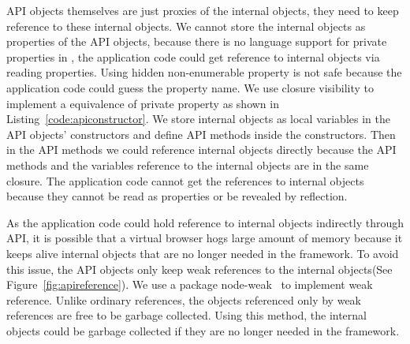 API objects themselves are just proxies of the internal objects,
they need to keep reference to these internal objects.
We cannot store the internal objects as properties of the API objects,
because there is no language support for private properties in \js,
the application code could get reference to internal objects
via reading properties.
Using hidden non-enumerable property is not safe because the application
code could guess the property name.
We use closure visibility to implement a equivalence of private property as
shown in Listing~\ref{code:apiconstructor}.
We store internal objects as local variables in the API objects' constructors
and define API methods inside the constructors.
Then in the API methods we could reference internal objects directly 
because the API methods
and the variables reference to the internal objects are in the same closure.
The application code cannot get the references to internal objects because
they cannot be read as properties or be revealed by reflection.




As the application code could hold reference to internal objects indirectly
through API,
it is possible that a virtual browser hogs large amount of memory
because it keeps alive internal objects that are no longer needed in
the framework.
To avoid this issue, the API objects only keep weak references to the
internal objects(See Figure~\ref{fig:apireference}).
We use a \nodejs{} package node-weak~\cite{nodeweak} to implement weak reference.
Unlike ordinary references, the objects referenced only by weak references are
free to be garbage collected.
Using this method, 
the internal objects could be garbage collected if they are no longer needed in
the framework.


\apireferencefig{}
